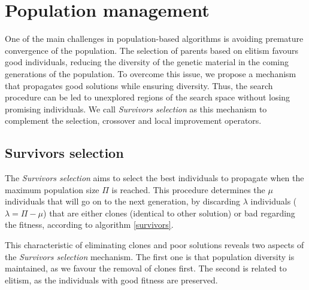 \section{Population management}
\label{sec:population-management}
One of the main challenges in population-based algorithms is avoiding premature convergence of the population. The selection of parents based on elitism favours good individuals, reducing the diversity of the genetic material in the coming generations of the population. To overcome this issue, we propose a mechanism that propagates good solutions while ensuring diversity. Thus, the search procedure can be led to unexplored regions of the search space without losing promising individuals. We call \textit{Survivors selection} as this mechanism to complement the selection, crossover and local improvement operators.


\subsection{Survivors selection}
\label{subsec:survivors}
The \textit{Survivors selection} aims to select the best individuals to propagate when the maximum population size $\Pi$ is reached. This procedure determines the $\mu$ individuals that will go on to the next generation, by discarding $\lambda$ individuals ($\lambda = \Pi - \mu$) that are either clones (identical to other solution) or bad regarding the fitness, according to algorithm \ref{survivors}.

This characteristic of eliminating clones and poor solutions reveals two aspects of the \textit{Survivors selection} mechanism. The first one is that population diversity is maintained, as we favour the removal of clones first. The second is related to elitism, as the individuals with good fitness are preserved. %

